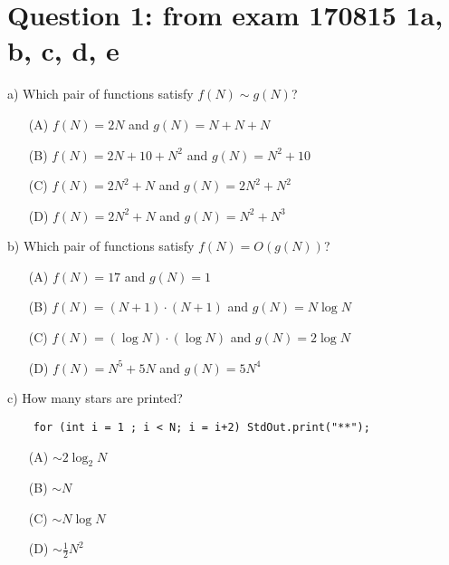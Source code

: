 \documentclass{tufte-handout}
\begin{document}
\section{\textbf{Question 1}: from exam 170815 1a, b, c, d, e}
\begin{description}
    \item{a)} Which pair of functions satisfy $f(N)\sim g(N)$?
    \begin{enumerate}
        \item[(A)] $f(N)= 2N$ and $g(N)=N+N+N$ 
        \item[(B)] $f(N)=2N+10 + N^2$ and $g(N)=N^2+10$ 
        \item[(C)] $f(N)=2N^2 + N$ and $g(N)=2N^2 + N^2$ 
        \item[(D)] $f(N)=2N^2 + N$ and $g(N)=N^2+N^3$ 
    \end{enumerate}
\bigskip
    \item{b)} Which pair of functions satisfy $f(N)=O(g(N))$?
      \begin{enumerate}
        \item[(A)] $f(N)=17$ and $g(N)=1$
        \item[(B)] $f(N)=(N+1)\cdot(N+1)$ and $g(N)=N\log N $ 
        \item[(C)] $f(N)=(\log N)\cdot(\log N)$ and $g(N)=2\log N$
        \item[(D)] $f(N)=N^5+5N$ and $g(N)=5N^4$ 

      \end{enumerate}
\bigskip
\item{c)} How many stars are printed?
\begin{verbatim}
    for (int i = 1 ; i < N; i = i+2) StdOut.print("**"); 
\end{verbatim}
      \begin{enumerate}
          \item[(A)] $\sim 2\log_2 N$
          \item[(B)] $\sim N$
          \item[(C)] $\sim N\log N$
          \item[(D)] $\sim\frac{1}{2}N^2$
      \end{enumerate}
      \medskip
    

\end{description}
\end{document}
